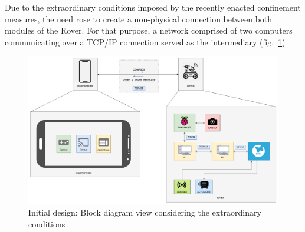 Due to the extraordinary conditions imposed by the recently enacted confinement measures, the need rose to create a non-physical connection between both modules of the Rover. For that purpose, a network comprised of two computers communicating over a TCP/IP connection served as the intermediary (fig.~\ref{fig:initial-design-2})

\begin{figure}[!ht]
\centering
\includegraphics[width=1.0\textwidth]{./sec/img/initial_design_diagram_2.png}
\caption{\label{fig:initial-design-2}Initial design: Block diagram view considering the extraordinary conditions}
\end{figure}

